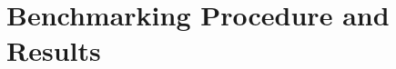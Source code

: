 \documentclass[10pt,a4paper]{report}
\begin{document}
\nocite{*}



\appendix
\makeatletter
\def\@seccntformat#1{Appendix~\csname the#1\endcsname:\quad}
\makeatother
\section{Benchmarking Procedure and Results}
\label{Bench}

     
\end{document}
